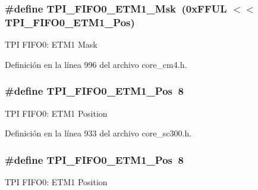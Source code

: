 \subsubsection[{\texorpdfstring{T\+P\+I\+\_\+\+F\+I\+F\+O0\+\_\+\+E\+T\+M1\+\_\+\+Msk}{TPI_FIFO0_ETM1_Msk}}]{\setlength{\rightskip}{0pt plus 5cm}\#define T\+P\+I\+\_\+\+F\+I\+F\+O0\+\_\+\+E\+T\+M1\+\_\+\+Msk~(0x\+F\+F\+U\+L $<$$<$ T\+P\+I\+\_\+\+F\+I\+F\+O0\+\_\+\+E\+T\+M1\+\_\+\+Pos)}\hypertarget{group___c_m_s_i_s___t_p_i_gaad9c1a6ed34a70905005a0cc14d5f01b}{}\label{group___c_m_s_i_s___t_p_i_gaad9c1a6ed34a70905005a0cc14d5f01b}
T\+PI F\+I\+F\+O0\+: E\+T\+M1 Mask 

Definición en la línea 996 del archivo core\+\_\+cm4.\+h.

\subsubsection[{\texorpdfstring{T\+P\+I\+\_\+\+F\+I\+F\+O0\+\_\+\+E\+T\+M1\+\_\+\+Pos}{TPI_FIFO0_ETM1_Pos}}]{\setlength{\rightskip}{0pt plus 5cm}\#define T\+P\+I\+\_\+\+F\+I\+F\+O0\+\_\+\+E\+T\+M1\+\_\+\+Pos~8}\hypertarget{group___c_m_s_i_s___t_p_i_gac5a2ef4b7f811d1f3d81ec919d794413}{}\label{group___c_m_s_i_s___t_p_i_gac5a2ef4b7f811d1f3d81ec919d794413}
T\+PI F\+I\+F\+O0\+: E\+T\+M1 Position 

Definición en la línea 933 del archivo core\+\_\+sc300.\+h.

\subsubsection[{\texorpdfstring{T\+P\+I\+\_\+\+F\+I\+F\+O0\+\_\+\+E\+T\+M1\+\_\+\+Pos}{TPI_FIFO0_ETM1_Pos}}]{\setlength{\rightskip}{0pt plus 5cm}\#define T\+P\+I\+\_\+\+F\+I\+F\+O0\+\_\+\+E\+T\+M1\+\_\+\+Pos~8}\hypertarget{group___c_m_s_i_s___t_p_i_gac5a2ef4b7f811d1f3d81ec919d794413}{}\label{group___c_m_s_i_s___t_p_i_gac5a2ef4b7f811d1f3d81ec919d794413}
T\+PI F\+I\+F\+O0\+: E\+T\+M1 Position 

